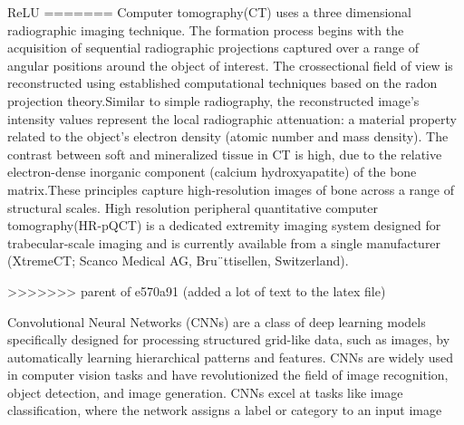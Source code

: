 \documentclass[
a4paper, 
12pt,
grayscalebody, %
abstract=on,
twoside, BCOR10mm, 12pt, DIV13,headinclude, footexclude, final, abstracton, openright
]{ibireprt}
\numberwithin{equation}{chapter}
\numberwithin{table}{chapter}
\numberwithin{figure}{chapter}
\numberwithin{algorithm}{chapter}
\numberwithin{example}{chapter}
\numberwithin{example}{chapter}
\begin{document}
ReLU
=======
Computer tomography(CT) uses a three dimensional radiographic imaging technique. The formation process begins with the acquisition of sequential radiographic projections captured over a range of angular positions around the object of interest. The crossectional field of view is reconstructed using established computational techniques based on the radon projection theory\cite{article}.Similar to simple radiography, the reconstructed image’s intensity values represent the local radiographic attenuation: a material property related to the object’s electron density (atomic number and mass density). The contrast between soft and mineralized tissue in CT is high, due to the relative electron-dense inorganic component (calcium hydroxyapatite) of the bone matrix.These principles capture high-resolution images of bone
across a range of structural scales. %
High resolution peripheral quantitative computer tomography(HR-pQCT) is a  dedicated extremity imaging system designed for trabecular-scale imaging and is currently available from a single manufacturer (XtremeCT; Scanco Medical AG,
Bru¨ttisellen, Switzerland). 

>>>>>>> parent of e570a91 (added a lot of text to the latex file)

Convolutional Neural Networks (CNNs) are a class of deep learning models specifically designed for processing structured grid-like data, such as images, by automatically learning hierarchical patterns and features. CNNs are widely used in computer vision tasks and have revolutionized the field of image recognition, object detection, and image generation. CNNs excel at tasks like image classification, where the network assigns a label or category to an input image\\
\end{document}
